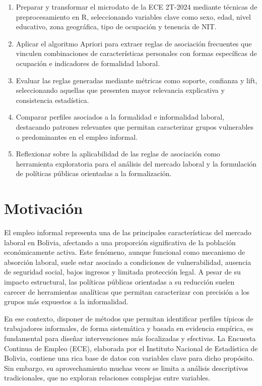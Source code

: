 \documentclass[Royal,times,sageh]{sagej}
\begin{document}
\begin{enumerate}
\def\labelenumi{\arabic{enumi}.}
\item
  Preparar y transformar el microdato de la ECE 2T-2024 mediante
  técnicas de preprocesamiento en R, seleccionando variables clave como
  sexo, edad, nivel educativo, zona geográfica, tipo de ocupación y
  tenencia de NIT.
\item
  Aplicar el algoritmo Apriori para extraer reglas de asociación
  frecuentes que vinculen combinaciones de características personales
  con formas específicas de ocupación e indicadores de formalidad
  laboral.
\item
  Evaluar las reglas generadas mediante métricas como soporte, confianza
  y lift, seleccionando aquellas que presenten mayor relevancia
  explicativa y consistencia estadística.
\item
  Comparar perfiles asociados a la formalidad e informalidad laboral,
  destacando patrones relevantes que permitan caracterizar grupos
  vulnerables o predominantes en el empleo informal.
\item
  Reflexionar sobre la aplicabilidad de las reglas de asociación como
  herramienta exploratoria para el análisis del mercado laboral y la
  formulación de políticas públicas orientadas a la formalización.
\end{enumerate}

\section{Motivación}\label{motivaciuxf3n}

El empleo informal representa una de las principales características del
mercado laboral en Bolivia, afectando a una proporción significativa de
la población económicamente activa. Este fenómeno, aunque funcional como
mecanismo de absorción laboral, suele estar asociado a condiciones de
vulnerabilidad, ausencia de seguridad social, bajos ingresos y limitada
protección legal. A pesar de su impacto estructural, las políticas
públicas orientadas a su reducción suelen carecer de herramientas
analíticas que permitan caracterizar con precisión a los grupos más
expuestos a la informalidad.

En ese contexto, disponer de métodos que permitan identificar perfiles
típicos de trabajadores informales, de forma sistemática y basada en
evidencia empírica, es fundamental para diseñar intervenciones más
focalizadas y efectivas. La Encuesta Continua de Empleo (ECE), elaborada
por el Instituto Nacional de Estadística de Bolivia, contiene una rica
base de datos con variables clave para dicho propósito. Sin embargo, su
aprovechamiento muchas veces se limita a análisis descriptivos
tradicionales, que no exploran relaciones complejas entre variables.
\end{document}
